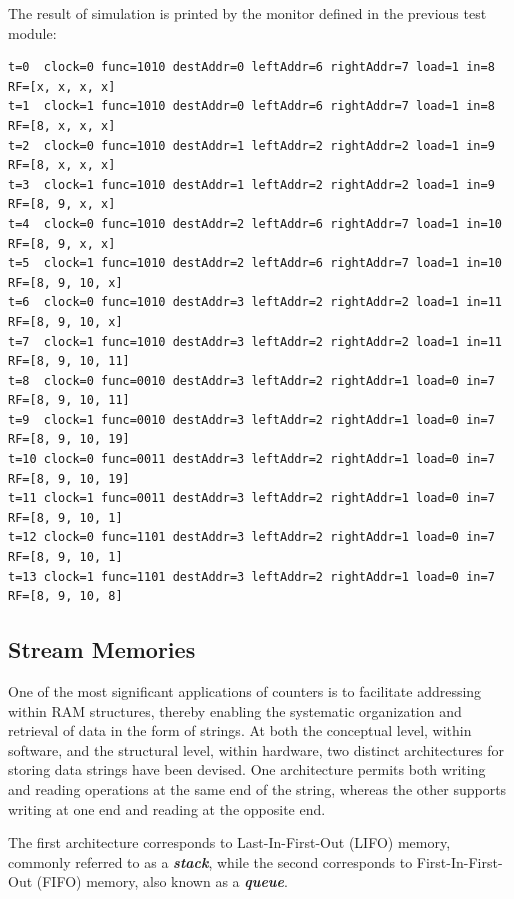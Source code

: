 The result of simulation is printed by the monitor defined in the previous test module:

{\footnotesize
\begin{verbatim}
t=0  clock=0 func=1010 destAddr=0 leftAddr=6 rightAddr=7 load=1 in=8  RF=[x, x, x, x]
t=1  clock=1 func=1010 destAddr=0 leftAddr=6 rightAddr=7 load=1 in=8  RF=[8, x, x, x]
t=2  clock=0 func=1010 destAddr=1 leftAddr=2 rightAddr=2 load=1 in=9  RF=[8, x, x, x]
t=3  clock=1 func=1010 destAddr=1 leftAddr=2 rightAddr=2 load=1 in=9  RF=[8, 9, x, x]
t=4  clock=0 func=1010 destAddr=2 leftAddr=6 rightAddr=7 load=1 in=10 RF=[8, 9, x, x]
t=5  clock=1 func=1010 destAddr=2 leftAddr=6 rightAddr=7 load=1 in=10 RF=[8, 9, 10, x]
t=6  clock=0 func=1010 destAddr=3 leftAddr=2 rightAddr=2 load=1 in=11 RF=[8, 9, 10, x]
t=7  clock=1 func=1010 destAddr=3 leftAddr=2 rightAddr=2 load=1 in=11 RF=[8, 9, 10, 11]
t=8  clock=0 func=0010 destAddr=3 leftAddr=2 rightAddr=1 load=0 in=7  RF=[8, 9, 10, 11]
t=9  clock=1 func=0010 destAddr=3 leftAddr=2 rightAddr=1 load=0 in=7  RF=[8, 9, 10, 19]
t=10 clock=0 func=0011 destAddr=3 leftAddr=2 rightAddr=1 load=0 in=7  RF=[8, 9, 10, 19]
t=11 clock=1 func=0011 destAddr=3 leftAddr=2 rightAddr=1 load=0 in=7  RF=[8, 9, 10, 1]
t=12 clock=0 func=1101 destAddr=3 leftAddr=2 rightAddr=1 load=0 in=7  RF=[8, 9, 10, 1]
t=13 clock=1 func=1101 destAddr=3 leftAddr=2 rightAddr=1 load=0 in=7  RF=[8, 9, 10, 8]
\end{verbatim}
}

\subsection{Stream Memories}
One of the most significant applications of counters is to facilitate addressing within RAM structures, thereby enabling the systematic organization and retrieval of data in the form of strings. At both the conceptual level, within software, and the structural level, within hardware, two distinct architectures for storing data strings have been devised. One architecture permits both writing and reading operations at the same end of the string, whereas the other supports writing at one end and reading at the opposite end.

The first architecture corresponds to Last-In-First-Out (LIFO) memory, commonly referred to as a {\bf {\em stack}}, while the second corresponds to First-In-First-Out (FIFO) memory, also known as a {\bf {\em queue}}.





